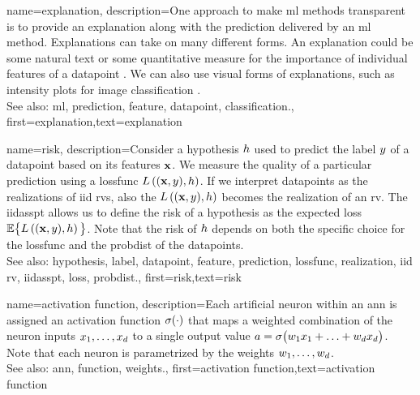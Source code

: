 {name={explanation},
	description={One approach to make \gls{ml} methods transparent is to provide an 
		explanation along with the \gls{prediction} delivered by an 
		\gls{ml} method. Explanations can take on many different forms. An explanation 
		could be some natural text or some quantitative measure for the importance 
		of individual \glspl{feature} of a \gls{datapoint} \cite{Molnar2019}. We can also 
		use visual forms of explanations, such as intensity plots for image \gls{classification} \cite{GradCamPaper}.
					\\ 
		See also: \gls{ml}, \gls{prediction}, \gls{feature}, \gls{datapoint}, \gls{classification}.},
	first={explanation},text={explanation} 
}

{name={risk},
	description={Consider a \gls{hypothesis} $h$ used to predict the \gls{label} 
		$y$ of a \gls{datapoint} based on its \glspl{feature} ${\bf x}$. We measure 
		the quality of a particular \gls{prediction} using a \gls{lossfunc} $L\left(({\bf x},y),h \right)$. 
		If we interpret \glspl{datapoint} as the \glspl{realization} of \gls{iid} \glspl{rv}, 
		also the $L\left(({\bf x},y),h \right)$ becomes the \gls{realization} 
		of an \gls{rv}. The \gls{iidasspt} allows us to define the risk of a \gls{hypothesis} 
		as the expected \gls{loss} $\mathbb{E} \big\{L\left(({\bf x},y),h \right) \big\}$. 
		Note that the risk of $h$ depends on both the specific choice for the \gls{lossfunc} and the 
		\gls{probdist} of the \glspl{datapoint}.
					\\ 
		See also: \gls{hypothesis}, \gls{label}, \gls{datapoint}, \gls{feature}, \gls{prediction}, \gls{lossfunc}, \gls{realization}, \gls{iid} \gls{rv}, \gls{iidasspt}, \gls{loss}, \gls{probdist}.},
	first={risk},text={risk} 
}

{name={activation function},
	description={Each artificial neuron within an \gls{ann} is 
		assigned an activation \gls{function} $\sigma(\cdot)$ that maps a weighted combination of 
		the neuron inputs $x_{1},\ldots,x_{d}$ to a single output 
		value $a = \sigma\big(w_{1} x_{1}+\ldots+w_{d} x_{d} \big)$. 
		Note that each neuron is parametrized by the \gls{weights} $w_{1},\ldots,w_{d}$.
					\\ 
		See also: \gls{ann}, \gls{function}, \gls{weights}.},
first={activation function},text={activation function} 
}

